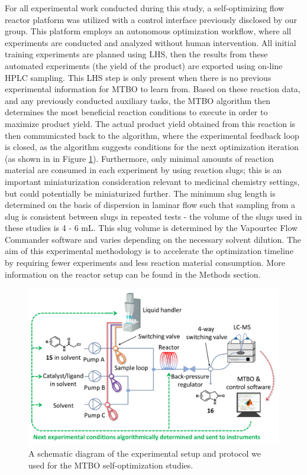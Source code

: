 For all experimental work conducted during this study, a self-optimizing flow reactor platform was utilized with a control interface previously disclosed by our group. This platform employs an autonomous optimization workflow, where all experiments are conducted and analyzed without human intervention. All initial training experiments are planned using LHS, then the results from these automated experiments (the yield of the product) are exported using on-line HPLC sampling. This LHS step is only present when there is no previous experimental information for MTBO to learn from. Based on these reaction data, and any previously conducted auxiliary tasks, the MTBO algorithm then determines the most beneficial reaction conditions to execute in order to maximize product yield. The actual product yield obtained from this reaction is then communicated back to the algorithm, where the experimental feedback loop is closed, as the algorithm suggests conditions for the next optimization iteration (as shown in in Figure \ref{fig:self_opt_setup}). Furthermore, only minimal amounts of reaction material are consumed in each experiment by using reaction slugs; this is an important miniaturization consideration relevant to medicinal chemistry settings, but could potentially be miniaturized further. The minimum slug length is determined on the basis of dispersion in laminar flow such that sampling from a slug is consistent between slugs in repeated tests - the volume of the slugs used in these studies is 4 - 6 mL. This slug volume is determined by the Vapourtec Flow Commander software and varies depending on the necessary solvent dilution. The aim of this experimental methodology is to accelerate the optimization timeline by requiring fewer experiments and less reaction material consumption. More information on the reactor setup can be found in the Methods section.

\begin{figure}
    \centering
    \includegraphics{gfx/Chapter03/self_optimization_setup.png}
    \caption{A schematic diagram of the experimental setup and protocol we used for the MTBO self-optimization studies.}
    \label{fig:self_opt_setup}
\end{figure}

